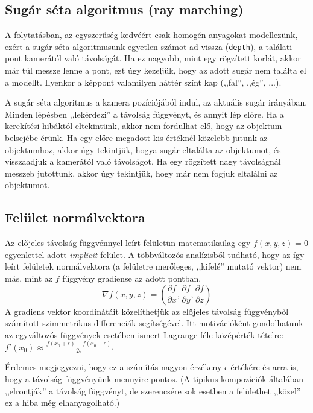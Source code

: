 \subsection{Sugár séta algoritmus (ray marching)}

A folytatásban, az egyszerűség kedvéért csak homogén anyagokat modellezünk, ezért a sugár séta
algoritmusunk egyetlen számot ad vissza (\texttt{depth}), a találati pont kamerától való távolságát.
Ha ez nagyobb, mint egy rögzített korlát, akkor már túl messze lenne a pont, ezt úgy kezeljük,
hogy az adott sugár nem találta el a modellt. Ilyenkor a képpont valamilyen háttér színt kap (,,fal'', ,,ég'', ...).

A sugár séta algoritmus a kamera pozíciójából indul, az aktuális sugár irányában. Minden lépésben ,,lekérdezi''
a távolság függvényt, és annyit lép előre. Ha a kerekítési hibáktól eltekintünk, akkor nem fordulhat elő,
hogy az objektum belsejébe érünk. Ha egy előre megadott kis értéknél közelebb jutunk az objektumhoz,
akkor úgy tekintjük, hogya sugár eltalálta az objektumot, és visszaadjuk a kamerától való távolságot.
Ha egy rögzített nagy távolságnál messzeb jutottunk, akkor úgy tekintjük, hogy már nem fogjuk eltalálni
az objektumot. 


\subsection{Felület normálvektora}

Az előjeles távolság függvénnyel leírt felületün matematikailag egy $f(x, y, z)=0$ egyenlettel
adott \emph{implicit} felület. A többváltozós analízisből tudható, hogy az így leírt felületek
normálvektora (a felületre merőleges, ,,kifelé'' mutató vektor) nem más, mint az $f$ függvény
gradiense az adott pontban.
$$
\nabla f(x, y, z) =
\left(
  \frac{\partial f}{\partial x}, 
  \frac{\partial f}{\partial y}, 
  \frac{\partial f}{\partial z} 
\right)
$$
A gradiens vektor koordinátáit közelíthetjük az előjeles távolság függvényből számított
szimmetrikus differenciák segítségével. Itt motivációként gondolhatunk az egyváltozós függvények esetében
ismert Lagrange-féle középérték tételre: 
$f'(x_0)\approx \frac{f(x_0+\epsilon) - f(x_0-\epsilon)}{2\epsilon}$.


Érdemes megjegyezni, hogy ez a számítás nagyon érzékeny $\epsilon$ értékére és arra is, hogy a
távolság függvényünk mennyire pontos. (A tipikus kompozíciók általában ,,elrontják'' a távolság függvényt, 
de szerencsére sok esetben a felülethet ,,közel'' ez a hiba még elhanyagolható.)

